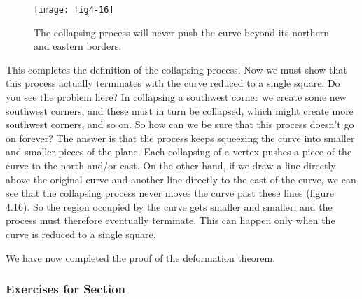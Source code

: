 \documentclass{book}
\begin{document}
\begin{figure}
\begin{center}
\texttt{[image: fig4-16]}
\caption{The collapsing process will never push the curve beyond its northern and eastern borders.}
\end{center}
\end{figure}

This completes the definition of the collapsing process.
Now we must show that this process actually terminates with the curve
reduced to a single square. Do you see the problem here? In collapsing a
southwest corner we create some new southwest corners, and these must
in turn be collapsed, which might create more southwest corners, and
so on. So how can we be sure that this process doesn't go on forever?
The answer is that the process keeps squeezing the curve into smaller
and smaller pieces of the plane. Each collapsing of a vertex pushes a
piece of the curve to the north and/or east. On the other hand, if we
draw a line directly above the original curve and another line directly
to the east of the curve, we can see that the collapsing process never
moves the curve past these lines (figure 4.16). So the region occupied
by the curve gets smaller and smaller, and the process must therefore
eventually terminate. This can happen only when the curve is reduced
to a single square.

We have now completed the proof of the deformation theorem.

\subsubsection{Exercises for Section \thesection}
\end{document}
